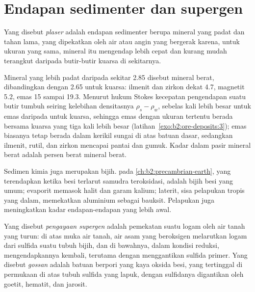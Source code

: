 \section{Endapan sedimenter dan supergen}\label{sec:b2:ore-deposits:sedimentary}

\begin{definition}[Plaser]\label{def:b2:ore-deposits:placer}
Yang disebut \emph{plaser} adalah endapan sedimenter berupa mineral yang padat dan tahan lama, yang dipekatkan oleh
air atau angin yang bergerak karena, untuk ukuran yang sama, mineral itu mengendap lebih cepat dan kurang mudah terangkut
daripada butir-butir kuarsa di sekitarnya.
\end{definition}

Mineral yang lebih padat daripada sekitar 2.85 disebut mineral berat, dibandingkan dengan 2.65 untuk kuarsa: ilmenit dan zirkon
dekat 4.7, magnetit 5.2, emas 15 sampai 19.3. Menurut hukum Stokes kecepatan pengendapan suatu butir tumbuh seiring
kelebihan densitasnya $\rho_s - \rho_w$, sebelas kali lebih besar untuk emas daripada untuk kuarsa, sehingga emas dengan
ukuran tertentu berada bersama kuarsa yang tiga kali lebih besar (latihan~\ref{exo:b2:ore-deposits:3}); emas
biasanya tetap berada dalam kerikil sungai di atas batuan dasar, sedangkan ilmenit, rutil, dan zirkon mencapai pantai dan
gumuk. Kadar dalam pasir mineral berat adalah persen berat mineral berat.

Sedimen kimia juga merupakan bijih.  pada \cref{ch:b2:precambrian-earth},
yang terendapkan ketika besi terlarut samudra teroksidasi, adalah bijih besi yang umum; evaporit
memasok halit dan garam kalium; laterit, sisa pelapukan tropis yang dalam,
memekatkan aluminium sebagai bauksit. Pelapukan juga meningkatkan kadar endapan-endapan yang lebih awal.

\begin{definition}\label{def:b2:ore-deposits:supergene}
Yang disebut \emph{pengayaan supergen} adalah pemekatan suatu logam oleh
air tanah yang turun: di atas muka air tanah, air asam yang beroksigen melarutkan logam dari
sulfida suatu tubuh bijih, dan di bawahnya, dalam kondisi reduksi, mengendapkannya kembali, terutama dengan
menggantikan sulfida primer. Yang disebut \emph{gossan} adalah batuan berpori yang kaya oksida besi, yang
tertinggal di permukaan di atas tubuh sulfida yang lapuk, dengan sulfidanya digantikan oleh goetit, hematit, dan
jarosit.
\end{definition}

